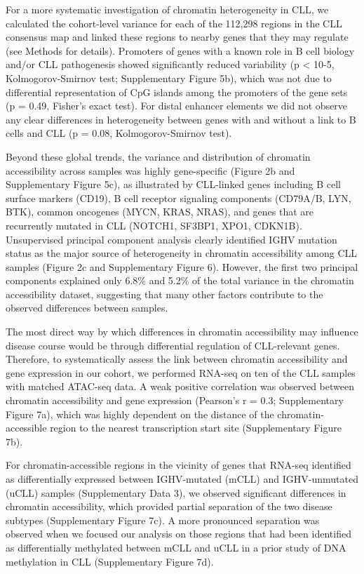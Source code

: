 \documentclass[10pt,]{article}
\begin{document}
For a more systematic investigation of chromatin heterogeneity in CLL,
we calculated the cohort-level variance for each of the 112,298 regions
in the CLL consensus map and linked these regions to nearby genes that
they may regulate (see Methods for details). Promoters of genes with a
known role in B cell biology and/or CLL pathogenesis showed
significantly reduced variability (p \textless{} 10-5,
Kolmogorov-Smirnov test; Supplementary Figure 5b), which was not due to
differential representation of CpG islands among the promoters of the
gene sets (p = 0.49, Fisher's exact test). For distal enhancer elements
we did not observe any clear differences in heterogeneity between genes
with and without a link to B cells and CLL (p = 0.08, Kolmogorov-Smirnov
test).

Beyond these global trends, the variance and distribution of chromatin
accessibility across samples was highly gene-specific (Figure 2b and
Supplementary Figure 5c), as illustrated by CLL-linked genes including B
cell surface markers (CD19), B cell receptor signaling components
(CD79A/B, LYN, BTK), common oncogenes (MYCN, KRAS, NRAS), and genes that
are recurrently mutated in CLL (NOTCH1, SF3BP1, XPO1,
CDKN1B)\citep{Stevenson2011, Puente2015, Landau2015}. Unsupervised
principal component analysis clearly identified IGHV mutation status as
the major source of heterogeneity in chromatin accessibility among CLL
samples (Figure 2c and Supplementary Figure 6). However, the first two
principal components explained only 6.8\% and 5.2\% of the total
variance in the chromatin accessibility dataset, suggesting that many
other factors contribute to the observed differences between samples.

The most direct way by which differences in chromatin accessibility may
influence disease course would be through differential regulation of
CLL-relevant genes. Therefore, to systematically assess the link between
chromatin accessibility and gene expression in our cohort, we performed
RNA-seq on ten of the CLL samples with matched ATAC-seq data. A weak
positive correlation was observed between chromatin accessibility and
gene expression (Pearson's r = 0.3; Supplementary Figure 7a), which was
highly dependent on the distance of the chromatin-accessible region to
the nearest transcription start site (Supplementary Figure 7b).

For chromatin-accessible regions in the vicinity of genes that RNA-seq
identified as differentially expressed between IGHV-mutated (mCLL) and
IGHV-unmutated (uCLL) samples (Supplementary Data 3), we observed
significant differences in chromatin accessibility, which provided
partial separation of the two disease subtypes (Supplementary Figure
7c). A more pronounced separation was observed when we focused our
analysis on those regions that had been identified as differentially
methylated between mCLL and uCLL in a prior study of DNA methylation in
CLL\citep{Kulis2012} (Supplementary Figure 7d).
\end{document}
